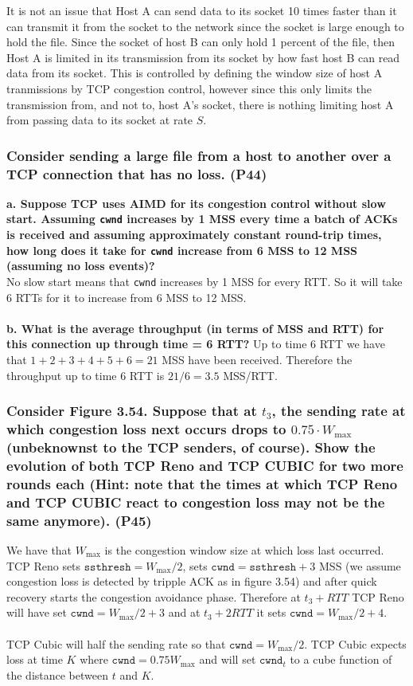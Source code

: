 It is not an issue that Host A can send data to its socket 10 times faster than it can transmit it from the socket to the network since the socket is large enough to hold the file. Since the socket of host B can only hold 1 percent of the file, then Host A is limited in its transmission from its socket by how fast host B can read data from its socket. This is controlled by defining the window size of host A tranmissions by TCP congestion control, however since this only limits the transmission from, and not to, host A's socket, there is nothing limiting host A from passing data to its socket at rate $S$.



\subsubsection{Consider sending a large file from a host to another over a TCP connection that has no loss. (P44)}

\textbf{a. Suppose TCP uses AIMD for its congestion control without slow start. Assuming \texttt{cwnd} increases by 1 MSS every time a batch of ACKs is received and assuming approximately constant round-trip times, how long does it take for \texttt{cwnd} increase from 6 MSS to 12 MSS (assuming no loss events)?} \\
No slow start means that \texttt{cwnd} increases by 1 MSS for every RTT. So it will take 6 RTTs for it to increase from 6 MSS to 12 MSS. \\
\\
\textbf{b. What is the average throughput (in terms of MSS and RTT) for this connection up through time = 6 RTT?}
Up to time 6 RTT we have that $1 + 2 + 3 + 4 + 5 + 6 = 21$ MSS have been received. Therefore the throughput up to time 6 RTT is $21/6 = 3.5$ MSS/RTT.



\subsubsection{Consider Figure 3.54. Suppose that at $t_3$, the sending rate at which congestion loss next occurs drops to $0.75 \cdot W_{\max}$ (unbeknownst to the TCP senders, of course). Show the evolution of both TCP Reno and TCP CUBIC for two more rounds each (Hint: note that the times at which TCP Reno and TCP CUBIC react to congestion loss may not be the same anymore). (P45)}

We have that $W_{\max}$ is the congestion window size at which loss last occurred. TCP Reno sets $\texttt{ssthresh} = W_{\max}/2$, sets $\texttt{cwnd} = \texttt{ssthresh} + 3$ MSS (we assume congestion loss is detected by tripple ACK as in figure 3.54) and after quick recovery starts the congestion avoidance phase. Therefore at $t_3 + RTT$ TCP Reno will have set $\texttt{cwnd} = W_{\max}/2 + 3$ and at $t_3 + 2 RTT$ it sets $\texttt{cwnd} = W_{\max}/2 + 4$. \\
\\
TCP Cubic will half the sending rate so that $\texttt{cwnd} =  W_{\max}/2$. TCP Cubic expects loss at time $K$ where $\texttt{cwnd} = 0.75 W_{\max}$ and will set $\texttt{cwnd}_t$ to a cube function of the distance between $t$ and $K$.



